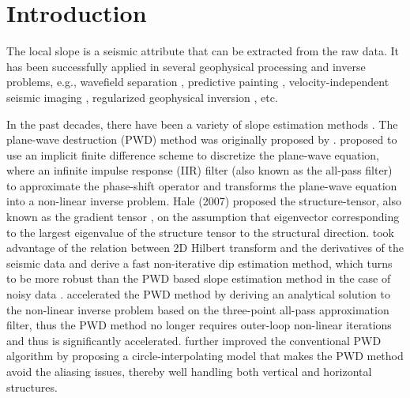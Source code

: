 
\section{Introduction}
The local slope is a seismic attribute that can be extracted from the raw data. It has been successfully applied in several geophysical processing and inverse problems, e.g., wavefield separation \cite[]{harlan1984signal,fomel2002pwd}, predictive painting \cite[]{fomel2010predictive}, velocity-independent seismic imaging \cite[]{fomel2007velocity}, regularized geophysical inversion \cite[]{fomel2007shape}, etc. 


In the past decades, there have been a variety of slope estimation methods . The plane-wave destruction (PWD) method was originally proposed by \cite{claerbout1992pvi}. \cite{fomel2002pwd} proposed to use an implicit finite difference scheme to discretize the plane-wave equation, where an infinite impulse response (IIR) filter (also known as the all-pass filter) to approximate the phase-shift operator and transforms the plane-wave equation into a non-linear inverse problem. Hale (2007) \cite{hale2007local} proposed the structure-tensor, also known as the gradient tensor \cite{van1995estimators},  on the assumption that eigenvector corresponding to the largest eigenvalue of the structure tensor  to the structural direction.  \cite{liuyang2015} took advantage of the relation between 2D Hilbert transform and the derivatives of the seismic data and derive a fast non-iterative dip estimation method, which turns to be more robust than the PWD based slope estimation method in the case of noisy data \cite{yangkang2018gji3}. \cite{zhonghuan2013accelerated} accelerated the PWD method by deriving an analytical solution to the non-linear inverse problem based on the three-point all-pass approximation filter, thus the PWD method no longer requires outer-loop non-linear iterations and thus is significantly accelerated. \cite{zhonghuan2013omnidirectional} further improved the conventional PWD algorithm by proposing a circle-interpolating model that makes the PWD method avoid the aliasing issues, thereby well handling both vertical and horizontal structures.

